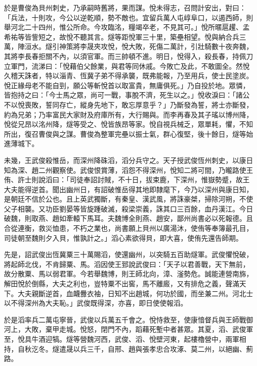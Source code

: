 \begin{pinyinscope}
 於是曹俊為貝州刺史，乃承嗣時舊將，果而謀。悅未得志，召問計安出，對曰：「兵法，十則攻，今公以逆乾順，勢不敵也。宜留兵萬人屯崞阜口，以遏西師，則舉河北二十四州，惟公所命。今攻臨洺，糧竭卒老，不見其可。」悅所暱扈趯、孟希祐等皆訾短之，故悅不聽其言。燧等距悅軍三十里，築壘相望。悅與納合兵三萬，陣洹水。燧引神策將李晟夾攻悅，悅大敗，死傷二萬計，引壯騎數十夜奔魏，其將李長春拒關不內，以須官軍。而三帥頓不進。明日，悅得入，殺長春，持佩刀立軍門，流涕曰：「悅藉伯父餘業，與君等同休戚。今敗亡及此，不敢圖全。然悅久稽天誅者，特以淄青、恆冀子弟不得承襲，既弗能報，乃至用兵，使士民塗炭。悅正緣母老不能自剄，願公等斬悅首以取富貴，無庸俱死。」乃自投於地。眾憐，皆抱持之曰：「今士馬之眾，尚可一戰，事脫不濟，死生以之。」悅收淚曰：「諸公不以悅喪敗，誓同存亡，縱身先地下，敢忘厚意乎？」乃斷發為誓，將士亦斷發，約為兄弟；乃率富民大家財及府庫所有，大行賜與。而李再春及其子瑤以博州降，悅從兄昂以洺州降，燧等受之、悅皆族昂等家。悅自視兵械乏，眾單耗，懼，不知所出，復召曹俊與之謀。曹俊為整軍完壘以振士氣，群心復堅，後十餘日，燧等始進薄城下。



 未幾，王武俊殺惟岳，而深州降硃滔，滔分兵守之。天子授武俊恆州刺史，以康日知為深、趙二州觀察使。武俊恨賞薄，滔怨不得深州，悅知二將可間，乃曨路使王侑、許士則說滔曰：「司徒奉詔討賊，不十日，拔束鹿，下深州，惟嶽勢蹙，故王大夫能得逆首。聞出幽州日，有詔破惟岳得其地即隸麾下，今乃以深州與康日知，是朝廷不信於公也。且上英武獨斷，有秦皇、漢武風，將誅豪桀，掃除河朔，不使父子相襲。又功臣劉晏等皆旋踵破滅，殺梁崇義，誅其口三百餘，血丹漢江。今日破魏，則取燕、趙如牽轅下馬耳。夫魏博全則燕、趙安，鄙州尚書必以死報德。且合從連衡，救災恤患，不朽之業也，尚書願上貝州以廣湯沐，使侑等奉簿最孔目，司徒朝至魏則夕入貝，惟孰計之。」滔心素欲得貝，即大喜，使侑先還告師期。



 先是，詔武俊出恆冀粟三十萬賜滔，使還幽州，以突騎五百助燧軍。武俊懼悅破，將起師北伐，不肯歸粟、馬。滔因使王郅說武俊曰：「天子以君善戰，天下無前，故分散粟、馬以弱君軍。今若舉魏博，則王師北向，漳、滏勢危。誠能連營南旆，解田悅於倒縣，大夫之利也，豈特粟不出窖，馬不離廄，又有排危之義，聲滿天下。大夫親斷逆首，血衊釁衣袖，日知不出趙城，何功於國，而坐兼二州。河北士以不得深州為大夫恥。」武俊既得深，亦喜，即日使使報滔。



 於是滔率兵二萬屯寧晉，武俊以兵萬五千會之。悅恃救至，使康愔督兵與王師戰御河上，大敗，棄甲走城。悅怒，閉門不內，蹈藉死塹中者甚眾。其夏，滔、武俊軍至，悅具牛酒迎犒。燧等營魏河西，武俊、滔、悅壁河東，起樓櫓營中，兩軍相持，自秋汔冬。燧遣晟以兵三千，自邢、趙與張孝忠合攻涿、莫二州，以絕幽、薊路。




\end{pinyinscope}

